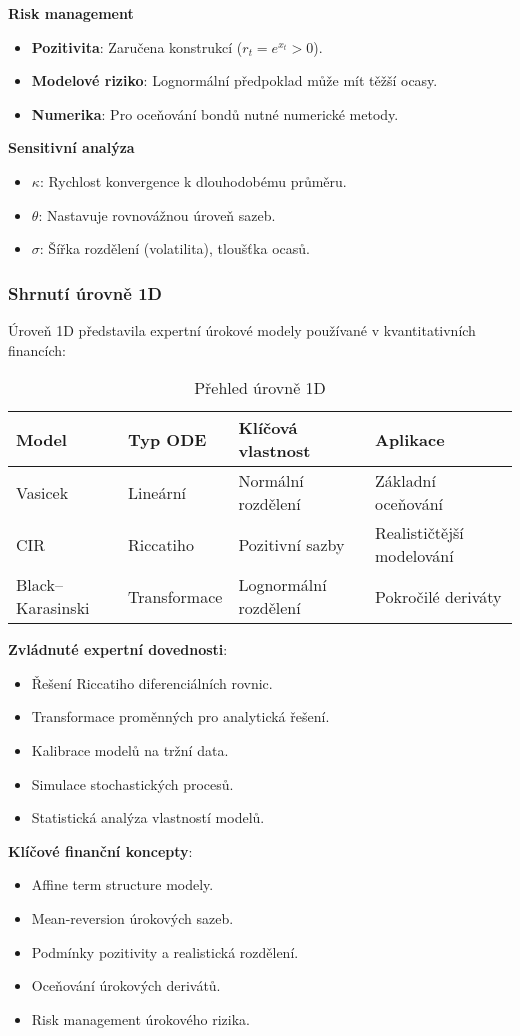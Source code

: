 \begin{example}
\noindent\textbf{Risk management}
\begin{itemize}
\item \textbf{Pozitivita}: Zaručena konstrukcí ($r_t=e^{x_t}>0$).
\item \textbf{Modelové riziko}: Lognormální předpoklad může mít těžší ocasy.
\item \textbf{Numerika}: Pro oceňování bondů nutné numerické metody.
\end{itemize}

\noindent\textbf{Sensitivní analýza}
\begin{itemize}
\item \textbf{$\kappa$}: Rychlost konvergence k dlouhodobému průměru.
\item \textbf{$\theta$}: Nastavuje rovnovážnou úroveň sazeb.
\item \textbf{$\sigma$}: Šířka rozdělení (volatilita), tloušťka ocasů.
\end{itemize}
\end{example}

\subsubsection{Shrnutí úrovně 1D}
\label{sec:shrnuti-uroven-1d}

Úroveň 1D představila expertní úrokové modely používané v kvantitativních financích:

\begin{table}[h]
\centering
\caption{Přehled úrovně 1D}
\label{tab:prehled-1d}
\begin{tabular}{@{}llll@{}}
\toprule
\textbf{Model} & \textbf{Typ ODE} & \textbf{Klíčová vlastnost} & \textbf{Aplikace} \\
\midrule
Vasicek & Lineární & Normální rozdělení & Základní oceňování \\
CIR & Riccatiho & Pozitivní sazby & Realističtější modelování \\
Black–Karasinski & Transformace & Lognormální rozdělení & Pokročilé deriváty \\
\bottomrule
\end{tabular}
\end{table}

\noindent\textbf{Zvládnuté expertní dovednosti}:
\begin{itemize}
\item Řešení Riccatiho diferenciálních rovnic.
\item Transformace proměnných pro analytická řešení.
\item Kalibrace modelů na tržní data.
\item Simulace stochastických procesů.
\item Statistická analýza vlastností modelů.
\end{itemize}

\noindent\textbf{Klíčové finanční koncepty}:
\begin{itemize}
\item Affine term structure modely.
\item Mean-reversion úrokových sazeb.
\item Podmínky pozitivity a realistická rozdělení.
\item Oceňování úrokových derivátů.
\item Risk management úrokového rizika.
\end{itemize}

